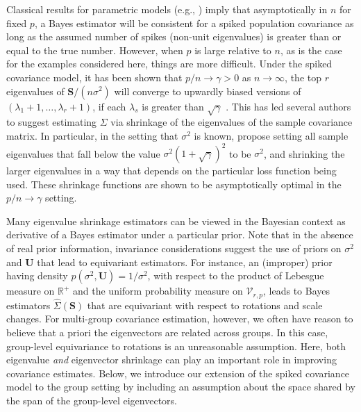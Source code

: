 \documentclass{article}
\newcommand{\bl}[1]{{\mathbf #1}}
\begin{document}
Classical results for parametric models (e.g., \citet{Schwartz1965})
imply that asymptotically in $n$ for fixed $p$, a Bayes estimator will
be consistent for a spiked population covariance as long as the
assumed number of spikes (non-unit eigenvalues) is greater than or
equal to the true number.  However, when $p$ is large relative to $n$,
as is the case for the examples considered here, things are more
difficult.  Under the spiked covariance model, it has been shown that
$p/n \rightarrow \gamma >0$ as $n\rightarrow \infty$, the top $r$
eigenvalues of $\bl S/(n\sigma^2)$ will converge to upwardly biased
versions of $(\lambda_1+1,\ldots, \lambda_r+1)$, if each $\lambda_s $
is greater than $\sqrt{\gamma}$ \citep{Baik2006, Paul2007} .  This has
led several authors to suggest estimating $\Sigma$ via shrinkage of
the eigenvalues of the sample covariance matrix. In particular, in the
setting that $\sigma^2$ is known, \citet{Donoho2013} propose setting
all sample eigenvalues that fall below the value
$\sigma^2(1+\sqrt{\gamma})^2$ to be $\sigma^2$, and shrinking the
larger eigenvalues in a way that depends on the particular loss
function being used.  These shrinkage functions are shown to be
asymptotically optimal in the $p/n\rightarrow \gamma$ setting.


Many eigenvalue shrinkage estimators can be viewed in the Bayesian
context as derivative of a Bayes estimator under a particular prior.
Note that in the absence of real prior information, invariance
considerations suggest the use of priors on $\sigma^2$ and $\bl U$
that lead to equivariant estimators.  For instance, an (improper)
prior having density $p(\sigma^2,\bl U) = 1/\sigma^2 $, with respect
to the product of Lebesgue measure on $\mathbb R^+$ and the uniform
probability measure on $\mathcal V_{r,p}$, leads to Bayes estimators
$\hat \Sigma(\bl S)$ that are equivariant with respect to rotations
and scale changes.  For multi-group covariance estimation, however, we
often have reason to believe that a priori the eigenvectors are
related across groups.  In this case, group-level equivariance to
rotations is an unreasonable assumption.  Here, both eigenvalue
\emph{and} eigenvector shrinkage can play an important role in
improving covariance estimates.  Below, we introduce our extension of
the spiked covariance model to the group setting by including an
assumption about the space shared by the span of the group-level eigenvectors.
\end{document}
